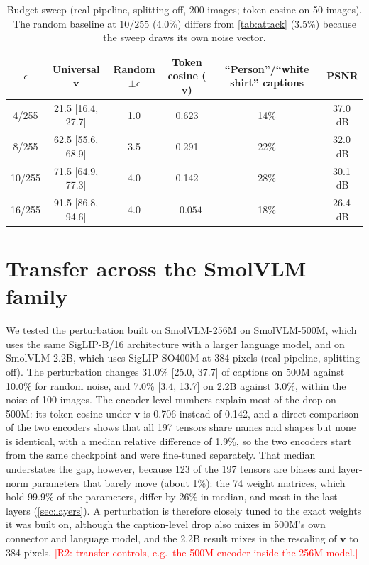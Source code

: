 \documentclass[10pt,twocolumn,letterpaper]{article}
\newcommand{\pend}[1]{\textcolor{red}{[#1]}}
\newcommand{\vv}{\boldsymbol{v}}
\begin{document}
\begin{table}[h]
\centering
\small
\begin{tabular}{@{}cccccc@{}}
\toprule
$\epsilon$ & Universal $\vv$ & Random $\pm\epsilon$ & Token cosine ($\vv$) & ``Person''/``white shirt'' captions & PSNR \\
\midrule
4/255 & 21.5 [16.4, 27.7] & 1.0 & 0.623 & 14\% & 37.0\,dB \\
8/255 & 62.5 [55.6, 68.9] & 3.5 & 0.291 & 22\% & 32.0\,dB \\
10/255 & 71.5 [64.9, 77.3] & 4.0 & 0.142 & 28\% & 30.1\,dB \\
16/255 & 91.5 [86.8, 94.6] & 4.0 & $-0.054$ & 18\% & 26.4\,dB \\
\bottomrule
\end{tabular}
\caption{Budget sweep (real pipeline, splitting off, 200 images; token cosine on 50 images). The random baseline at $10/255$ (4.0\%) differs from \cref{tab:attack} (3.5\%) because the sweep draws its own noise vector.}
\label{tab:eps}
\end{table}

\section{Transfer across the SmolVLM family}
\label{app:transfer}

We tested the perturbation built on SmolVLM-256M on SmolVLM-500M, which uses the same SigLIP-B/16 architecture with a larger language model, and on SmolVLM-2.2B, which uses SigLIP-SO400M at 384 pixels (real pipeline, splitting off). The perturbation changes 31.0\% [25.0, 37.7] of captions on 500M against 10.0\% for random noise, and 7.0\% [3.4, 13.7] on 2.2B against 3.0\%, within the noise of 100 images. The encoder-level numbers explain most of the drop on 500M: its token cosine under $\vv$ is 0.706 instead of 0.142, and a direct comparison of the two encoders shows that all 197 tensors share names and shapes but none is identical, with a median relative difference of 1.9\%, so the two encoders start from the same checkpoint and were fine-tuned separately. That median understates the gap, however, because 123 of the 197 tensors are biases and layer-norm parameters that barely move (about 1\%): the 74 weight matrices, which hold 99.9\% of the parameters, differ by 26\% in median, and most in the last layers (\cref{sec:layers}). A perturbation is therefore closely tuned to the exact weights it was built on, although the caption-level drop also mixes in 500M's own connector and language model, and the 2.2B result mixes in the rescaling of $\vv$ to 384 pixels. \pend{R2: transfer controls, e.g.\ the 500M encoder inside the 256M model.}
\end{document}
